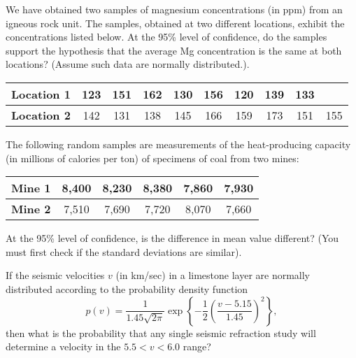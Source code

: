 \begin{problem}
We have obtained two samples of magnesium concentrations (in ppm) from an igneous rock unit.
The samples, obtained at two different locations, exhibit the concentrations listed below.
At the 95\% level of confidence, do the samples support the hypothesis that the average
Mg concentration is the same at both locations? (Assume such data are normally distributed.).
\begin{table}[H]
\centering
\begin{tabular}{|l||c|c|c|c|c|c|c|c|c|} \hline
\bf{Location 1} & 123 &  151 & 162 & 130 & 156 & 120 & 139 & 133 & \\ \hline
\bf{Location 2} & 142 &  131 & 138 & 145 & 166 & 159 & 173 & 151 & 155 \\ \hline
\end{tabular}
\end{table}
\end{problem}

\begin{problem}
The following random samples are measurements of the heat-producing capacity (in millions of calories
per ton) of specimens of coal from two mines:
\begin{table}[H]
\centering
\begin{tabular}{|l||c|c|c|c|c|} \hline
\bf{Mine 1} & 8,400 &  8,230 & 8,380 & 7,860 & 7,930 \\ \hline
\bf{Mine 2} & 7,510 &  7,690 & 7,720 & 8,070 & 7,660 \\ \hline
\end{tabular}
\end{table}
At the 95\% level of confidence, is the difference in mean value different?
(You must first check if the standard deviations are similar).
\end{problem}

\begin{problem}
If the seismic velocities $v$ (in km/sec) in a limestone layer are normally distributed according to the probability density function
$$
p(v) = \frac{1}{1.45\sqrt{2\pi}} \exp{\left \{ -\frac{1}{2} \left (\frac{v - 5.15}{1.45} \right )^2 \right \}},
$$
then what is the probability that any single seismic refraction study will determine a velocity in the $5.5 < v < 6.0$ range?
\end{problem}

